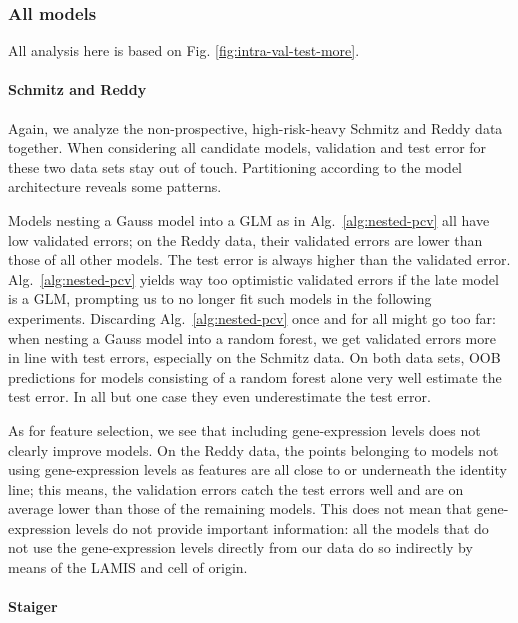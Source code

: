 \subsubsection{All models}



All analysis here is based on Fig. \ref{fig:intra-val-test-more}.

\paragraph{Schmitz and Reddy}
Again, we analyze the non-prospective, high-risk-heavy Schmitz and Reddy data together. When 
considering all candidate models, validation and test error for these two data sets 
stay out of touch. Partitioning according to the model architecture reveals some patterns. 

Models 
nesting a Gauss model into a GLM as in Alg.\ \ref{alg:nested-pcv} all have low validated errors; on 
the Reddy data, their validated errors are lower than those of all other models. The test error is 
always higher than the validated error. Alg.\ \ref{alg:nested-pcv} 
yields way too optimistic validated errors if the late model is a GLM, prompting us to no longer 
fit such models in the following experiments. Discarding Alg.\ \ref{alg:nested-pcv} once and for all
might go too far: when nesting a Gauss model into a random forest, we get validated errors more in 
line with test errors, especially on the Schmitz data. On both data sets, OOB predictions for 
models consisting of a random forest alone very well estimate the test error. In all but one case 
they even underestimate the test error. 

As for feature selection, we see that including gene-expression levels does not clearly improve
models. On the Reddy data, the points belonging to models not using 
gene-expression levels as features are all close to or underneath the identity line; this means, 
the validation errors catch the test errors well and are on average lower than those 
of the remaining models. This does not mean that gene-expression levels do not provide important 
information: all the models that do not use the gene-expression levels directly from our data 
do so indirectly by means of the LAMIS and cell of origin. 

\paragraph{Staiger}

